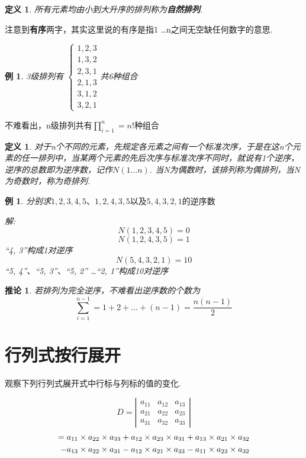 \documentclass[12pt, a4paper, oneside]{ctexbook}
\newtheorem{definition}[theorem]{定义}
\newtheorem{corollary}[theorem]{推论}
\newtheorem{example}[theorem]{例}
\begin{document}
\begin{definition}
    所有元素均由小到大升序的排列称为\textbf{自然排列}. 
\end{definition}

注意到\textbf{有序}两字，其实这里说的有序是指1 \dots n之间无空缺任何数字的意思. 

\begin{example}
    3级排列有
    $\begin{cases}
        1, 2, 3 \\
        1, 3, 2 \\
        2, 3, 1 \\
        2, 1, 3 \\
        3, 1, 2 \\
        3, 2, 1    
    \end{cases}$共6种组合
\end{example}

不难看出，n级排列共有$\prod_{i=1}^n = n!$种组合

\begin{definition}
    对于n个不同的元素，先规定各元素之间有一个标准次序，于是在这n个元素的任一排列中，当某两个元素的先后次序与标准次序不同时，就说有1个逆序，逆序的总数即为逆序数，记作$N(1 \dots n)$. 
    当N为偶数时，该排列称为偶排列，当N为奇数时，称为奇排列. 
\end{definition}

\begin{example}
    分别求$1, 2, 3, 4, 5\mbox{、}1, 2, 4, 3, 5\mbox{以及}5, 4, 3, 2, 1\mbox{的逆序数}$


    解: 
    $$N(1, 2, 3, 4, 5) = 0$$
    $$N(1, 2, 4, 3, 5) = 1$$
    ``4, 3''构成1对逆序
    $$N(5, 4, 3, 2, 1) = 10$$
    ``5, 4''、``5, 3''、``5, 2'' \dots ``2, 1''构成10对逆序
\end{example}

\begin{corollary}
    若排列为完全逆序，不难看出逆序数的个数为
    $$\sum_{i=1}^{n-1} = 1 + 2 + \dots + (n-1) = \frac{n(n-1)}{2}$$
\end{corollary}

\section{行列式按行展开}
观察下列行列式展开式中行标与列标的值的变化. 


$$D=\left | \begin{matrix}
    a_{11} & a_{12} & a_{13} \\
    a_{21} & a_{22} & a_{23} \\
    a_{31} & a_{32} & a_{33}
\end{matrix} \right |$$
\begin{align}
    = a_{11} \times a_{22} \times a_{33} + a_{12} \times a_{23} \times a_{31} + a_{13} \times a_{21} \times a_{32} \notag \\
    - a_{13} \times a_{22} \times a_{31} - a_{12} \times a_{21} \times a_{33} - a_{11} \times a_{23} \times a_{32} \notag
\end{align}
\end{document}
